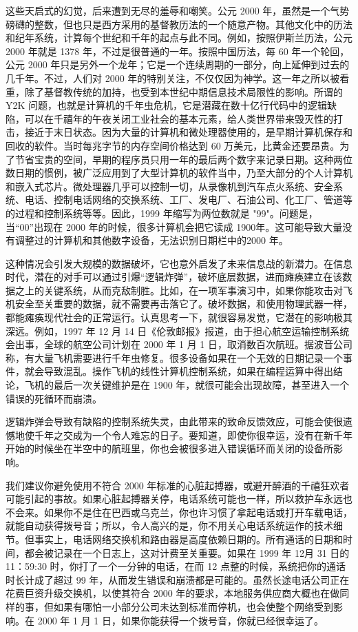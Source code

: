 这些天启式的幻觉，后来遭到无尽的羞辱和嘲笑。公元 2000 年，虽然是一个气势磅礴的整数，但也只是西方采用的基督教历法的一个随意产物。其他文化中的历法和纪年系统，计算每个世纪和千年的起点与此不同。例如，按照伊斯兰历法，公元 2000 年就是 1378 年，不过是很普通的一年。按照中国历法，每 60 年一个轮回，公元 2000 年只是另外一个龙年；它是一个连续周期的一部分，向上延伸到过去的几千年。不过，人们对 2000 年的特别关注，不仅仅因为神学。这一年之所以被看重，除了基督教传统的加持，也受到本世纪中期信息技术局限性的影响。所谓的 Y2K 问题，也就是计算机的千年虫危机，它是潜藏在数十亿行代码中的逻辑缺陷，可以在千禧年的午夜关闭工业社会的基本元素，给人类世界带来毁灭性的打击，接近于末日状态。因为大量的计算机和微处理器使用的，是早期计算机保存和回收的软件。当时每兆字节的内存空间价格达到 60 万美元，比黄金还要昂贵。为了节省宝贵的空间，早期的程序员只用一年的最后两个数字来记录日期。这种两位数日期的惯例，被广泛应用到了大型计算机的软件当中，乃至大部分的个人计算机和嵌入式芯片。微处理器几乎可以控制一切，从录像机到汽车点火系统、安全系统、电话、控制电话网络的交换系统、工厂、发电厂、石油公司、化工厂、管道等的过程和控制系统等等。因此，1999 年缩写为两位数就是 "99"。问题是，当“00”出现在 2000 年的时候，很多计算机会把它读成 1900年。这可能导致大量没有调整过的计算机和其他数字设备，无法识别日期栏中的2000 年。


这种情况会引发大规模的数据破坏，它也意外启发了未来信息战的新潜力。在信息时代，潜在的对手可以通过引爆“逻辑炸弹”，破坏底层数据，进而瘫痪建立在该数据之上的关键系统，从而克敌制胜。比如，在一项军事演习中，如果你能攻击对飞机安全至关重要的数据，就不需要再击落它了。破坏数据，和使用物理武器一样，都能瘫痪现代社会的正常运行。认真思考一下，就很容易发觉，它潜在的影响极其深远。例如，1997 年 12 月 14 日《伦敦邮报》报道，由于担心航空运输控制系统会出事，全球的航空公司计划在 2000 年 1 月 1 日，取消数百次航班。据波音公司称，有大量飞机需要进行千年虫修复。很多设备如果在一个无效的日期记录一个事件，就会导致混乱。操作飞机的线性计算机控制系统，如果在编程运算中得出结论，飞机的最后一次关键维护是在 1900 年，就很可能会出现故障，甚至进入一个错误的死循环而崩溃。


逻辑炸弹会导致有缺陷的控制系统失灵，由此带来的致命反馈效应，可能会使很遗憾地使千年之交成为一个令人难忘的日子。要知道，即使你很幸运，没有在新千年开始的时候坐在半空中的航班里，你也会被很多进入错误循环而关闭的设备所影响。


我们建议你避免使用不符合 2000 年标准的心脏起搏器，或避开醉酒的千禧狂欢者可能引起的事故。如果心脏起搏器关停，电话系统可能也一样，所以救护车永远也不会来。如果你不是住在巴西或乌克兰，你也许习惯了拿起电话或打开车载电话，就能自动获得拨号音；所以，令人高兴的是，你不用关心电话系统运作的技术细节。但事实上，电话网络交换机和路由器是高度依赖日期的。所有通话的日期和时间，都会被记录在一个日志上，这对计费至关重要。如果在 1999 年 12月 31 日的 11：59:30 时，你打了一个一分钟的电话，在而 12 点整的时候，系统把你的通话时长计成了超过 99 年，从而发生错误和崩溃都是可能的。虽然长途电话公司正在花费巨资升级交换机，以使其符合 2000 年的要求，本地服务供应商大概也在做同样的事，但如果有哪怕一小部分公司未达到标准而停机，也会使整个网络受到影响。在 2000 年 1 月 1 日，如果你能获得一个拨号音，你就已经很幸运了。


